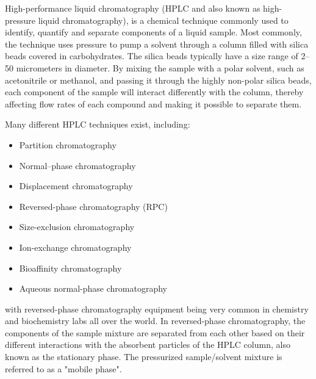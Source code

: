 


\label{sec:hplc}
High-performance liquid chromatography (HPLC and also known as high-pressure liquid chromatography), is a chemical technique commonly used to identify, quantify and separate components of a liquid sample. Most commonly, the technique uses pressure to pump a solvent through a column filled with silica beads covered in carbohydrates. The silica beads typically have a size range of 2–50 micrometers in diameter. By mixing the sample with a polar solvent, such as acetonitrile or methanol, and passing it through the highly non-polar silica beads, each component of the sample will interact differently with the column, thereby affecting flow rates of each compound and making it possible to separate them. \cite{wiki_hplc}

Many different HPLC techniques exist, including:
\begin{itemize}
    \item Partition chromatography
    \item Normal–phase chromatography
    \item Displacement chromatography
    \item Reversed-phase chromatography (RPC)
    \item Size-exclusion chromatography
    \item Ion-exchange chromatography
    \item Bioaffinity chromatography
    \item Aqueous normal-phase chromatography
\end{itemize}
with reversed-phase chromatography equipment being very common in chemistry and biochemistry labs all over the world. In reversed-phase chromatography, the components of the sample mixture are separated from each other based on their different interactions with the absorbent particles of the HPLC column, also known as the stationary phase. The pressurized sample/solvent mixture is referred to as a "mobile phase".

